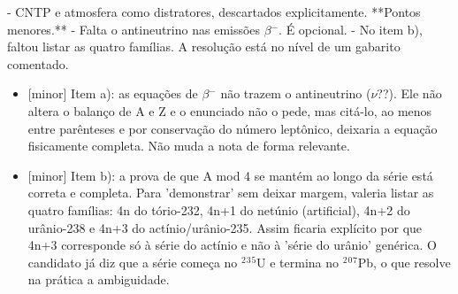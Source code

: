 \documentclass{article}%
\begin{document}
{-} CNTP e atmosfera como distratores, descartados explicitamente.\newline%
\newline%
**Pontos menores.**\newline%
{-} Falta o antineutrino nas emissões $\beta$$^{-}$. É opcional.\newline%
{-} No item b), faltou listar as quatro famílias.\newline%
\newline%
A resolução está no nível de um gabarito comentado.%
\begin{itemize}%
\item%
{[}minor{]} Item a): as equações de $\beta$$^{-}$ não trazem o antineutrino ($\nu$??). Ele não altera o balanço de A e Z e o enunciado não o pede, mas citá{-}lo, ao menos entre parênteses e por conservação do número leptônico, deixaria a equação fisicamente completa. Não muda a nota de forma relevante.%
\item%
{[}minor{]} Item b): a prova de que A mod 4 se mantém ao longo da série está correta e completa. Para 'demonstrar' sem deixar margem, valeria listar as quatro famílias: 4n do tório{-}232, 4n+1 do netúnio (artificial), 4n+2 do urânio{-}238 e 4n+3 do actínio/urânio{-}235. Assim ficaria explícito por que 4n+3 corresponde só à série do actínio e não à 'série do urânio' genérica. O candidato já diz que a série começa no $^2$$^3$$^{5}$U e termina no $^2$$^{0}$$^{7}$Pb, o que resolve na prática a ambiguidade.%
\end{itemize}%
\end{document}
